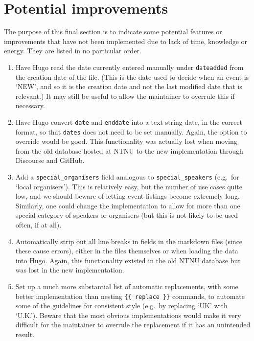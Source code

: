 \documentclass[12pt]{scrartcl}
\theoremstyle{definition}
\begin{document}
\section{Potential improvements}
The purpose of this final section is to indicate some potential features or improvements that have not been implemented due to lack of time, knowledge or energy.
They are listed in no particular order.

\begin{enumerate}
\item Have Hugo read the date currently entered manually under \verb|dateadded| from the creation date of the file.
(This is the date used to decide when an event is `NEW', and so it is the creation date and not the last modified date that is relevant.)
It may still be useful to allow the maintainer to overrule this if necessary.
\item Have Hugo convert \verb|date| and \verb|enddate| into a text string date, in the correct format, so that \verb|dates| does not need to be set manually.
Again, the option to override would be good.
This functionality was actually lost when moving from the old database hosted at NTNU to the new implementation through Discourse and GitHub.
\item Add a \verb|special_organisers| field analogous to \verb|special_speakers| (e.g.\ for `local organisers').
This is relatively easy, but the number of use cases quite low, and we should beware of letting event listings become extremely long.
Similarly, one could change the implementation to allow for more than one special category of speakers or organisers (but this is not likely to be used often, if at all).
\item Automatically strip out all line breaks in fields in the markdown files (since these cause errors), either in the files themselves or when loading the data into Hugo. Again, this functionality existed in the old NTNU database but was lost in the new implementation.
\item Set up a much more substantial list of automatic replacements, with some better implementation than nesting \verb|{{ replace }}| commands, to automate some of the guidelines for consistent style (e.g.\ by replacing `UK' with `U.K.'). Beware that the most obvious implementations would make it very difficult for the maintainer to overrule the replacement if it has an unintended result.
\end{enumerate}
\end{document}
